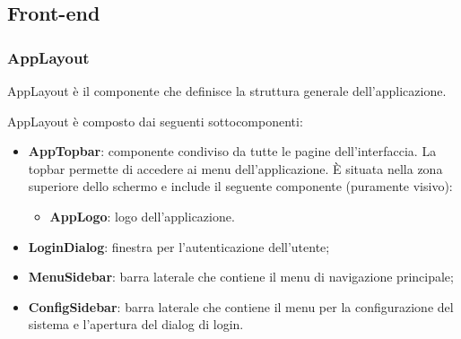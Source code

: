 \subsection{Front-end}

\subsubsection{AppLayout}

\par AppLayout è il componente che definisce la struttura generale dell'applicazione.

\par AppLayout è composto dai seguenti sottocomponenti:
\begin{itemize}
  \item \textbf{AppTopbar}: componente condiviso da tutte le pagine dell'interfaccia. La topbar permette di accedere ai menu dell'applicazione. È situata nella zona superiore dello schermo e include il seguente componente (puramente visivo):
  \begin{itemize}
    \item \textbf{AppLogo}: logo dell'applicazione.
  \end{itemize}
  \item \textbf{LoginDialog}: finestra per l'autenticazione dell'utente;
  \item \textbf{MenuSidebar}: barra laterale che contiene il menu di navigazione principale;
  \item \textbf{ConfigSidebar}: barra laterale che contiene il menu per la configurazione del sistema e l'apertura del dialog di login.
\end{itemize}

